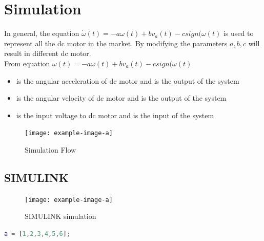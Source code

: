 \documentclass[12pt,a4paper]{article}
\begin{document}
	\section{Simulation}
	
	In general, the equation \(\dot{\omega}(t) = - a\omega(t) + bv_a(t) - csign(\omega(t)\) is used to represent all the dc motor in the market. By modifying the parameters \(a, b, c\) will result in different dc motor.\\
	
	From equation \(\dot{\omega}(t) = - a\omega(t) + bv_a(t) - csign(\omega(t)\)
	\begin{itemize}
		\item { is the angular acceleration of dc motor and is the output of the system}
		\item { is the angular velocity of dc motor and is the output of the system}
		\item { is the input voltage to dc motor and is the input of the system}
	\end{itemize}

	\begin{figure}[ht]
		\centering
		\texttt{[image: example-image-a]}
		\caption{Simulation Flow}
		\label{fig:Simulation Flow}
	\end{figure}
	
	\subsection{SIMULINK}
	
	\begin{figure}[ht]
		\centering
		\texttt{[image: example-image-a]}
		\caption{SIMULINK simulation}
		\label{fig:SIMULINK simulation}
	\end{figure}
	
	\begin{lstlisting}[language=MATLAB]
	a = [1,2,3,4,5,6];
	\end{lstlisting}
\end{document}
